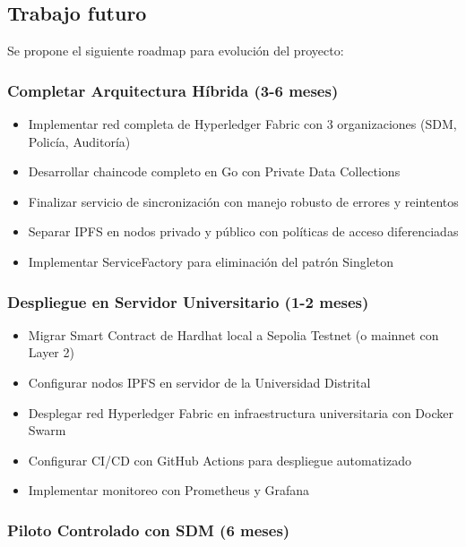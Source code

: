 \subsection{Trabajo futuro}
Se propone el siguiente roadmap para evolución del proyecto:

\subsubsection*{Completar Arquitectura Híbrida (3-6 meses)}

\begin{itemize}
    \item Implementar red completa de Hyperledger Fabric con 3 organizaciones (SDM, Policía, Auditoría)
    \item Desarrollar chaincode completo en Go con Private Data Collections
    \item Finalizar servicio de sincronización con manejo robusto de errores y reintentos
    \item Separar IPFS en nodos privado y público con políticas de acceso diferenciadas
    \item Implementar ServiceFactory para eliminación del patrón Singleton
\end{itemize}

\subsubsection*{Despliegue en Servidor Universitario (1-2 meses)}

\begin{itemize}
    \item Migrar Smart Contract de Hardhat local a Sepolia Testnet (o mainnet con Layer 2)
    \item Configurar nodos IPFS en servidor de la Universidad Distrital
    \item Desplegar red Hyperledger Fabric en infraestructura universitaria con Docker Swarm
    \item Configurar CI/CD con GitHub Actions para despliegue automatizado
    \item Implementar monitoreo con Prometheus y Grafana
\end{itemize}

\subsubsection*{Piloto Controlado con SDM (6 meses)}

